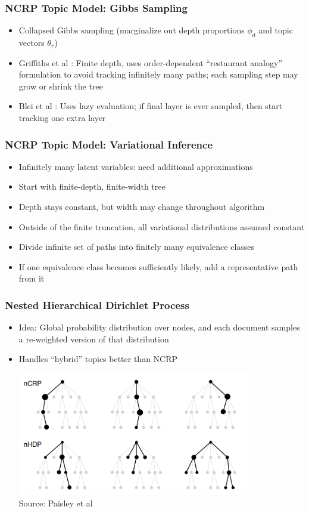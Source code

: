 \documentclass{beamer}
\begin{document}
\begin{frame}
\frametitle{NCRP Topic Model: Gibbs Sampling}
\begin{itemize}[<+->]
\item Collapsed Gibbs sampling (marginalize out depth proportions $\phi_d$ and topic vectors $\theta_r$)
\item Griffiths et al \cite{griffiths2004hierarchical}: Finite depth, uses order-dependent ``restaurant analogy'' formulation to avoid tracking infinitely many paths; each sampling step may grow or shrink the tree
\item Blei et al \cite{blei2010ncrp}: Uses lazy evaluation; if final layer is ever sampled, then start tracking one extra layer
\end{itemize}
\end{frame}

\begin{frame}
\frametitle{NCRP Topic Model: Variational Inference}
\begin{itemize}[<+->]
\item Infinitely many latent variables: need additional approximations
\item Start with finite-depth, finite-width tree
\item Depth stays constant, but width may change throughout algorithm
\item Outside of the finite truncation, all variational distributions assumed constant
\item Divide infinite set of paths into finitely many equivalence classes
\item If one equivalence class becomes sufficiently likely, add a representative path from it
\end{itemize}
\end{frame}

\begin{frame}
\frametitle{Nested Hierarchical Dirichlet Process}
\begin{itemize}[<+->]
\item Idea: Global probability distribution over nodes, and each document samples a re-weighted version of that distribution
\item Handles ``hybrid'' topics better than NCRP
\begin{center}
\includegraphics[width=0.8\textwidth]{../figures/ncrp_vs_nhdp.png} \\
\footnotesize Source: Paisley et al \cite{paisley2015nhdp}
\end{center}
\end{itemize}
\end{frame}
\end{document}
